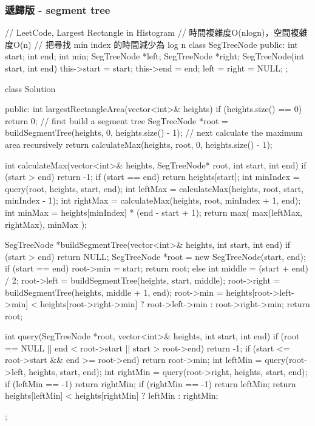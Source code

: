 \subsubsection{遞歸版 - segment tree}
\begin{Code}
// LeetCode, Largest Rectangle in Histogram
// 時間複雜度O(nlogn)，空間複雜度O(n)
// 把尋找 min index 的時間減少為 log n
class SegTreeNode {
public:
    int start;
    int end;
    int min;
    SegTreeNode *left;
    SegTreeNode *right;
    SegTreeNode(int start, int end) {
        this->start = start;
        this->end = end;
        left = right = NULL;
    }
};

class Solution {
public:
    int largestRectangleArea(vector<int>& heights) {
        if (heights.size() == 0) return 0;
        // first build a segment tree
        SegTreeNode *root = buildSegmentTree(heights, 0, heights.size() - 1);
        // next calculate the maximum area recursively
        return calculateMax(heights, root, 0, heights.size() - 1);
    }

    int calculateMax(vector<int>& heights, SegTreeNode* root, int start, int end) {
        if (start > end) {
            return -1;
        }
        if (start == end) {
            return heights[start];
        }
        int minIndex = query(root, heights, start, end);
        int leftMax = calculateMax(heights, root, start, minIndex - 1);
        int rightMax = calculateMax(heights, root, minIndex + 1, end);
        int minMax = heights[minIndex] * (end - start + 1);
        return max( max(leftMax, rightMax), minMax );
    }

    SegTreeNode *buildSegmentTree(vector<int>& heights, int start, int end) {
        if (start > end) return NULL;
        SegTreeNode *root = new SegTreeNode(start, end);
        if (start == end) {
            root->min = start;
            return root;
        } else {
            int middle = (start + end) / 2;
            root->left = buildSegmentTree(heights, start, middle);
            root->right = buildSegmentTree(heights, middle + 1, end);
            root->min = heights[root->left->min] < heights[root->right->min]
                        ? root->left->min : root->right->min;
            return root;
        }
    }

    int query(SegTreeNode *root, vector<int>& heights, int start, int end) {
        if (root == NULL || end < root->start || start > root->end) return -1;
        if (start <= root->start && end >= root->end) {
            return root->min;
        }
        int leftMin = query(root->left, heights, start, end);
        int rightMin = query(root->right, heights, start, end);
        if (leftMin == -1) return rightMin;
        if (rightMin == -1) return leftMin;
        return heights[leftMin] < heights[rightMin] ? leftMin : rightMin;
    }
};
\end{Code}

